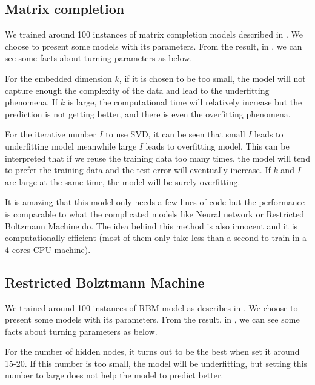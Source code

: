 \documentclass[bj, preprint]{imsart}
\begin{document}



\subsection{Matrix completion}\label{sebsec:results.svd}
We trained around 100 instances of matrix completion models described in . We choose to present some models with its parameters. From the result, in , we can see some facts about turning parameters as below.

For the embedded dimension $k$, if it is chosen to be too small, the model will not capture enough the complexity of the data and lead to the underfitting phenomena. If $k$ is large, the computational time will relatively increase but the prediction is not getting better, and there is even the overfitting phenomena. 

For the iterative number $I$ to use SVD, it can be seen that small $I$ leads to underfitting model meanwhile large $I$ leads to overfitting model. This can be interpreted that if we reuse the training data too many times, the model will tend to prefer the training data and the test error will eventually increase. If $k$ and $I$ are large at the same time, the model will be surely overfitting.

It is amazing that this model only needs a few lines of code but the performance is comparable to what the complicated models like Neural network or Restricted Boltzmann Machine do. The idea behind this method is also innocent and it is computationally efficient (most of them only take less than a second to train in a 4 cores CPU machine).     



\subsection{Restricted Bolztmann Machine}\label{sebsec:results.rbm}

We trained around 100 instances of RBM model as describes in . We choose to present some models with its parameters. From the result, in , we can see some facts about turning parameters as below.

For the number of hidden nodes, it turns out to be the best when set it around 15-20. If this number is too small, the model will be underfitting, but setting this number to large does not help the model to predict better.
\end{document}
